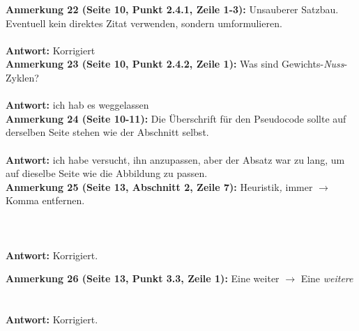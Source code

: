 \documentclass[a4paper,12pt]{book}
\begin{document}
\noindent
\textbf{Anmerkung 22 (Seite 10, Punkt 2.4.1, Zeile 1-3):}
Unsauberer Satzbau. Eventuell kein direktes Zitat verwenden, sondern umformulieren.
\\ \\
\textbf{Antwort:} Korrigiert
\\

\noindent
\textbf{Anmerkung 23 (Seite 10, Punkt 2.4.2, Zeile 1):}
Was sind Gewichts-\emph{Nuss}-Zyklen? \\
\\
\textbf{Antwort:} ich hab es weggelassen
\\

\noindent
\textbf{Anmerkung 24 (Seite 10-11):}
Die Überschrift für den Pseudocode sollte auf derselben Seite stehen wie der Abschnitt selbst. \\ \\
\textbf{Antwort:} ich habe versucht, ihn anzupassen, aber der Absatz war zu lang, um auf dieselbe Seite wie die Abbildung zu passen.
\\

\noindent
\textbf{Anmerkung 25 (Seite 13, Abschnitt 2, Zeile 7):}
Heuristik\emph{,} immer $\rightarrow$ Komma entfernen. \\
\\
\\ \\
\textbf{Antwort:}
Korrigiert.

\noindent
\textbf{Anmerkung 26 (Seite 13, Punkt 3.3, Zeile 1):}
Eine weiter $\rightarrow$ Eine \emph{weitere} \\
\\ \\
\textbf{Antwort:}
Korrigiert.
\end{document}
